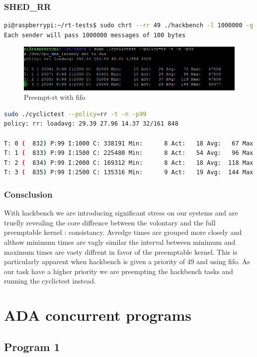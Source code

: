 \documentclass[10pt,a4paper]{article}
\begin{document}
\subsubsection{SHED\_RR}
\begin{lstlisting}[language=bash,caption={Hackbench with shed\_rr and priority 49}]
pi@raspberrypi:~/rt-tests$ sudo chrt --rr 49 ./hackbench -l 1000000 -g 1q                     
Each sender will pass 1000000 messages of 100 bytes
\end{lstlisting}
\begin{figure}[H]
\includegraphics[width=16cm]{Preempt-RR-WithHackbench.png}
\caption{Preempt-rt with fifo}
\end{figure}
\begin{lstlisting}[language=bash,caption={Volontary kernel}]
sudo ./cyclictest --policy=rr -t -n -p99
policy: rr: loadavg: 29.39 27.96 14.37 32/161 848          

T: 0 (  832) P:99 I:1000 C: 338191 Min:      8 Act:   18 Avg:   67 Max:   49660
T: 1 (  833) P:99 I:1500 C: 225480 Min:      8 Act:   54 Avg:   96 Max:   49563
T: 2 (  834) P:99 I:2000 C: 169312 Min:      8 Act:   18 Avg:  118 Max:   49511
T: 3 (  835) P:99 I:2500 C: 135316 Min:      9 Act:   19 Avg:  144 Max:   47964
\end{lstlisting}
\subsubsection{Consclusion}
With hackbench we are introducing significant stress on our systems and are truelly revealing the core diffrence between the volontary and the full preemptable kernel : consistancy. Avredge times are grouped more closely and althow minimum times are vagly similar the interval between minimum and maximum times are vasty diffrent in favor of the preemptable kernel.
This is particularly apparent when hackbench is given a priority of 49 and using fifo. As our task have a higher priority we are preempting the hackbench tasks and running the cyclictest instead. 
\section{ADA concurrent programs}
\subsection{Program 1}
\end{document}
